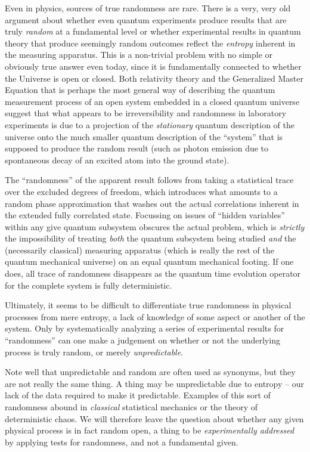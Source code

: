 \documentclass[12pt]{book}
\begin{document}
Even in physics, sources of true randomness are rare.  There is a very,
very old argument about whether even quantum experiments produce results
that are truly {\em random} at a fundamental level or whether
experimental results in quantum theory that produce seemingly random
outcomes reflect the {\em entropy} inherent in the measuring apparatus.
This is a non-trivial problem with no simple or obviously true answer
even today, since it is fundamentally connected to whether the Universe
is open or closed.  Both relativity theory and the Generalized Master
Equation that is perhaps the most general way of describing the quantum
measurement process of an open system embedded in a closed quantum
universe suggest that what appears to be irreversibility and randomness
in laboratory experiments is due to a projection of the {\em stationary}
quantum description of the universe onto the much smaller quantum
description of the ``system'' that is supposed to produce the random
result (such as photon emission due to spontaneous decay of an excited
atom into the ground state).

The ``randomness'' of the apparent result follows from taking a
statistical trace over the excluded degrees of freedom, which introduces
what amounts to a random phase approximation that washes out the actual
correlations inherent in the extended fully correlated state.  Focussing
on issues of ``hidden variables'' within any give quantum subsystem
obscures the actual problem, which is {\em strictly} the impossibility
of treating {\em both} the quantum subsystem being studied {\em and} the
(necessarily classical) measuring apparatus (which is really the rest of
the quantum mechanical universe) on an equal quantum mechanical footing.
If one does, all trace of randomness disappears as the quantum time
evolution operator for the complete system is fully deterministic.

Ultimately, it seems to be difficult to differentiate true randomness in
physical processes from mere entropy, a lack of knowledge of some aspect
or another of the system.  Only by systematically analyzing a series of
experimental results for ``randomness'' can one make a judgement on
whether or not the underlying process is truly random, or merely {\em
unpredictable}.  

Note well that unpredictable and random are often used as synonyms, but
they are not really the same thing.  A thing may be unpredictable due to
entropy -- our lack of the data required to make it predictable.
Examples of this sort of randomness abound in {\em classical}
statistical mechanics or the theory of deterministic chaos.  We will
therefore leave the question about whether any given physical process is
in fact random open, a thing to be {\em experimentally addressed} by
applying tests for randomness, and not a fundamental given.
\end{document}
